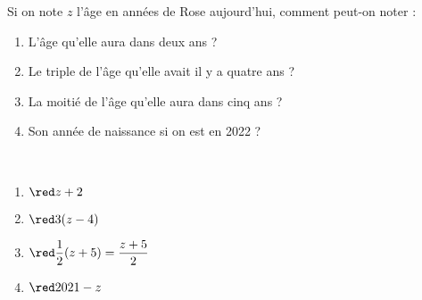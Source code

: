 \begin{exercice}
   Si on note $z$ l'âge en années de Rose aujourd'hui, comment peut-on noter :
   \begin{enumerate}
      \item L'âge qu'elle aura dans deux ans ?
      \item Le triple de l'âge qu'elle avait il y a quatre ans ?
      \item La moitié de l'âge qu'elle aura dans cinq ans ?
      \item Son année de naissance si on est en 2022 ?
   \end{enumerate}
\end{exercice}

\begin{corrige}
   \ \\ [-5mm]
   \begin{multicols}{2}
      \begin{enumerate}
         \item $\red z+2$
         \item $\red 3(z-4)$
         \item $\red \dfrac12(z+5) =\dfrac{z+5}{2}$ \smallskip
         \item $\red 2021-z$
      \end{enumerate}
   \end{multicols}
\end{corrige}